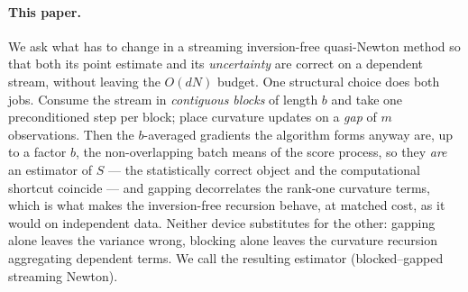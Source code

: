 \paragraph{This paper.}
We ask what has to change in a streaming inversion-free quasi-Newton method so that both its point
estimate and its \emph{uncertainty} are correct on a dependent stream, without leaving the $O(dN)$
budget. One structural choice does both jobs. Consume the stream in \emph{contiguous blocks} of length
$b$ and take one preconditioned step per block; place curvature updates on a \emph{gap} of $m$
observations. Then the $b$-averaged gradients the algorithm forms anyway are, up to a factor $b$, the
non-overlapping batch means of the score process, so they \emph{are} an estimator of $S$ --- the
statistically correct object and the computational shortcut coincide --- and gapping decorrelates the
rank-one curvature terms, which is what makes the inversion-free recursion behave, at matched cost, as
it would on independent data. Neither device substitutes for the other: gapping alone leaves the
variance wrong, blocking alone leaves the curvature recursion aggregating dependent terms. We call the
resulting estimator \bgsn{} (blocked--gapped streaming Newton).

